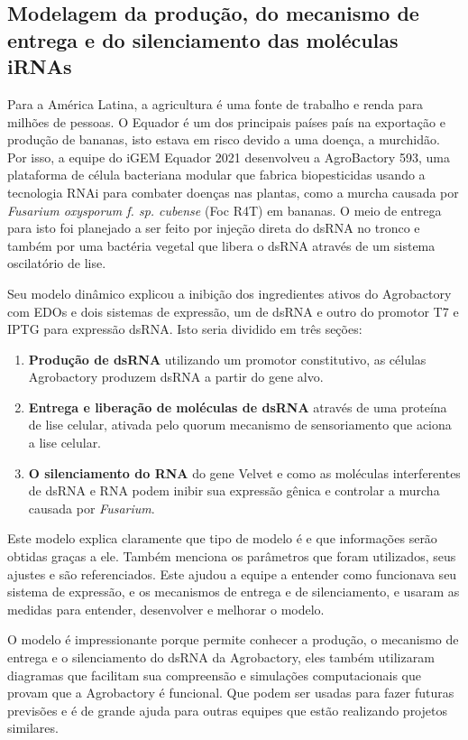 \documentclass[11pt, letterpaper, portuguese]{article}
\begin{document}
    \subsection{Modelagem da produção, do mecanismo de entrega e do silenciamento das moléculas iRNAs}
\par{Para a América Latina, a agricultura é uma fonte de trabalho e renda para milhões de pessoas. O Equador é um dos principais países país na exportação e produção de bananas, isto estava em risco devido a uma doença, a murchidão. Por isso, a equipe do iGEM Equador 2021 desenvolveu a AgroBactory 593, uma plataforma de célula bacteriana modular que fabrica biopesticidas usando a tecnologia RNAi para combater doenças nas plantas, como a murcha causada por \textit{Fusarium oxysporum f. sp. cubense} (Foc R4T) em
bananas. O meio de entrega para isto foi planejado a ser feito por injeção direta do dsRNA no tronco e também por uma bactéria vegetal que libera o dsRNA através de um sistema oscilatório de lise.}
\par{Seu modelo dinâmico explicou a inibição dos ingredientes ativos do Agrobactory com EDOs e dois sistemas de expressão, um de dsRNA e outro do promotor T7 e IPTG para expressão dsRNA. Isto seria dividido em três seções:}
\begin{enumerate}
            \item \textbf{Produção de dsRNA} utilizando um promotor constitutivo, as células Agrobactory produzem dsRNA a partir do gene alvo.
            \item \textbf{Entrega e liberação de moléculas de dsRNA} através de uma proteína de lise celular, ativada pelo quorum mecanismo de sensoriamento que aciona a lise celular.
            \item \textbf{O silenciamento do RNA} do gene Velvet e como as moléculas interferentes de dsRNA e RNA podem inibir sua expressão gênica e controlar a murcha causada por \textit{Fusarium}.
\end{enumerate}
\par{Este modelo explica claramente que tipo de modelo é e que informações serão obtidas graças a ele. Também menciona os parâmetros que foram utilizados, seus ajustes e são referenciados. Este ajudou a equipe a entender como funcionava seu sistema de expressão, e os mecanismos de entrega e de silenciamento, e usaram as medidas para entender, desenvolver e melhorar o modelo.}
\par{O modelo é impressionante porque permite conhecer a produção, o mecanismo de entrega e o silenciamento do dsRNA da Agrobactory, eles também utilizaram diagramas que facilitam sua compreensão e simulações computacionais que provam que a Agrobactory é funcional. Que podem ser usadas para fazer futuras previsões e é de grande ajuda para outras equipes que estão realizando projetos similares.}
\end{document}
